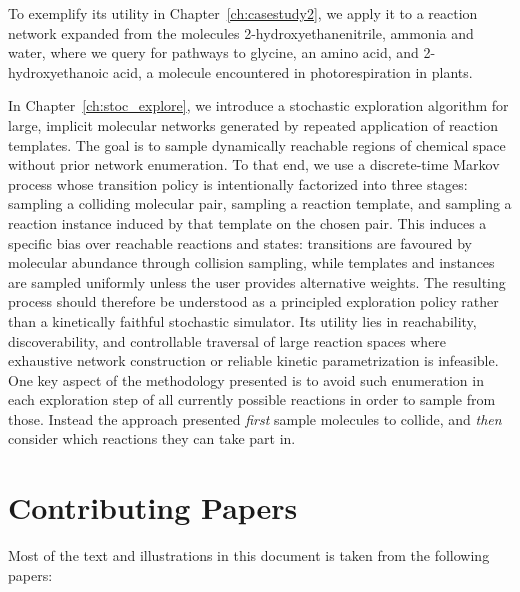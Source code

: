 To exemplify its utility in Chapter~\ref{ch:casestudy2}, we apply it to a reaction network expanded from the molecules 2-hydroxyethanenitrile, ammonia and water, where we query for pathways to glycine, an amino acid, and 2-hydroxyethanoic acid, a molecule encountered in photorespiration in plants.

In Chapter~\ref{ch:stoc_explore}, we introduce a stochastic exploration algorithm for large, implicit molecular networks generated by repeated application of reaction templates. The goal is to sample dynamically reachable regions of chemical space without prior network enumeration. To that end, we use a discrete-time Markov process whose transition policy is intentionally factorized into three stages: sampling a colliding molecular pair, sampling a reaction template, and sampling a reaction instance induced by that template on the chosen pair. This induces a specific bias over reachable reactions and states: transitions are favoured by molecular abundance through collision sampling, while templates and instances are sampled uniformly unless the user provides alternative weights. The resulting process should therefore be understood as a principled exploration policy rather than a kinetically faithful stochastic simulator. Its utility lies in reachability, discoverability, and controllable traversal of large reaction spaces where exhaustive network construction or reliable kinetic parametrization is infeasible. One key aspect of the methodology presented is to avoid such enumeration in each exploration step of all currently possible reactions in order to sample from those. Instead the approach presented \emph{first} sample molecules to collide, and \emph{then} consider which reactions they can take part in.

\section{Contributing Papers}

Most of the text and illustrations in this document is taken from the following papers:

